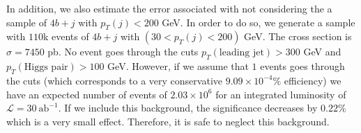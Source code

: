 In addition, we also estimate the error associated with not considering the a sample of $4b+j$ with $p_T(j)<200$ GeV. In order to do so, we generate a sample with $110$k events of $4b+j$ with $(30<p_T(j)<200)$ GeV. The cross section is $\sigma=7450$ pb. No event goes through the cuts $p_T(\text{leading jet})>300$ GeV and $p_T(\text{Higgs pair})>100$ GeV. However, if we assume that $1$ events goes through the cuts (which corresponds to a very conservative $9.09\times 10^{-4}\%$ efficiency) we have an expected number of events of $2.03\times 10^{6}$ for an integrated luminosity of $\mathcal{L}=30~\text{ab}^{-1}$. If we include this background, the significance decreases by $0.22\%$ which is a very small effect. Therefore, it is safe to neglect this background.

